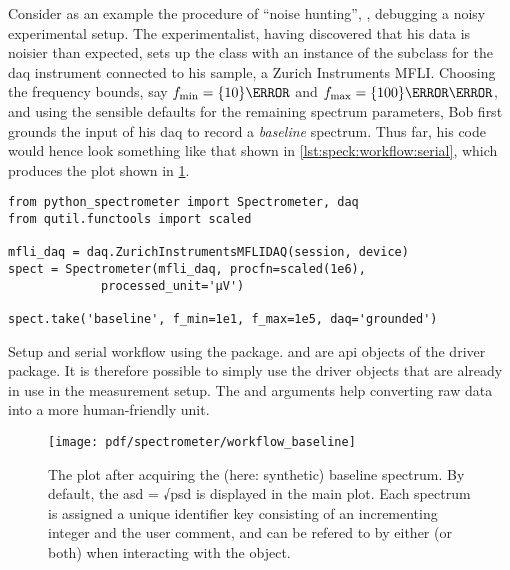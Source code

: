 Consider as an example the procedure of \enquote{noise hunting}, \ie, debugging a noisy experimental setup.
The experimentalist,
having discovered that his data is noisier than expected, sets up the  class with an instance of the  subclass for the \gls{daq} instrument connected to his sample, a Zurich Instruments MFLI.
Choosing the frequency bounds, say $\fmin = \qty{10}{\hertz}$ and $\fmax = \qty{100}{\kilo\hertz}$, and using the sensible defaults for the remaining spectrum parameters, Bob first grounds the input of his \gls{daq} to record a \emph{baseline} spectrum.
Thus far, his code would hence look something like that shown in \cref{lst:speck:workflow:serial}, which produces the plot shown in \cref{fig:speck:software:workflow:baseline}.

\begin{listing}[htpb]
    \begin{verbatim}
from python_spectrometer import Spectrometer, daq
from qutil.functools import scaled

mfli_daq = daq.ZurichInstrumentsMFLIDAQ(session, device)
spect = Spectrometer(mfli_daq, procfn=scaled(1e6),
             processed_unit='μV')

spect.take('baseline', f_min=1e1, f_max=1e5, daq='grounded')
    \end{verbatim}
    \caption[\pyspeck serial workflow]{
        Setup and serial workflow using the \pyspeck package.
         and  are \gls{api} objects of the  driver package.
        It is therefore possible to simply use the driver objects that are already in use in the measurement setup.
        The  and  arguments help converting raw data into a more human-friendly unit.
    }
    \label{lst:speck:workflow:serial}
\end{listing}
\begin{figure}
    \centering
    \texttt{[image: pdf/spectrometer/workflow\_baseline]}
    \caption{
        The \pyspeck plot after acquiring the (here: synthetic) baseline spectrum.
        By default, the \gls{asd} = √\gls{psd} is displayed in the main plot.
        Each spectrum is assigned a unique identifier key consisting of an incrementing integer and the user comment, and can be refered to by either (or both) when interacting with the object.
    }
    \label{fig:speck:software:workflow:baseline}
\end{figure}

